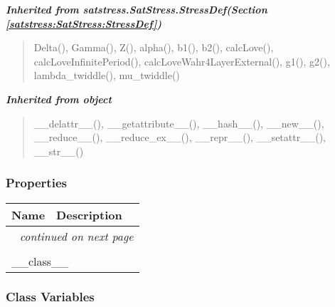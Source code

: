 \large{\textbf{\textit{Inherited from satstress.SatStress.StressDef\textit{(Section \ref{satstress:SatStress:StressDef})}}}}

\begin{quote}
Delta(), Gamma(), Z(), alpha(), b1(), b2(), calcLove(), calcLoveInfinitePeriod(), calcLoveWahr4LayerExternal(), g1(), g2(), lambda\_twiddle(), mu\_twiddle()
\end{quote}

\large{\textbf{\textit{Inherited from object}}}

\begin{quote}
\_\_delattr\_\_(), \_\_getattribute\_\_(), \_\_hash\_\_(), \_\_new\_\_(), \_\_reduce\_\_(), \_\_reduce\_ex\_\_(), \_\_repr\_\_(), \_\_setattr\_\_(), \_\_str\_\_()
\end{quote}


  \subsubsection{Properties}

    \vspace{-1cm}
\hspace{\varindent}\begin{longtable}{|p{\varnamewidth}|p{\vardescrwidth}|l}
\cline{1-2}
\cline{1-2} \centering \textbf{Name} & \centering \textbf{Description}& \\
\cline{1-2}
\endhead\cline{1-2}\multicolumn{3}{r}{\small\textit{continued on next page}}\\\endfoot\cline{1-2}
\endlastfoot\multicolumn{2}{|l|}{\textit{Inherited from object}}\\
\multicolumn{2}{|p{\varwidth}|}{\raggedright \_\_class\_\_}\\
\cline{1-2}
\end{longtable}



  \subsubsection{Class Variables}

